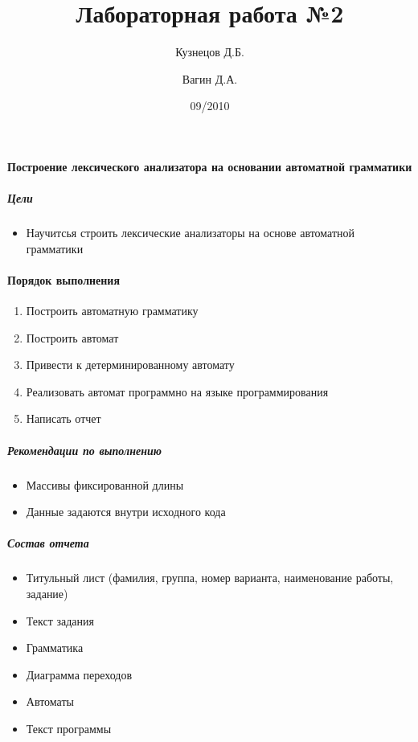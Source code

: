 \documentclass[a4paper,12pt]{article}
\title{Лабораторная работа №2}
\author{Кузнецов Д.Б.\and Вагин Д.А.}
\date{09/2010}
\begin{document}
\paragraph{Построение лексического анализатора на основании автоматной грамматики}
\subparagraph{Цели}
\begin{itemize}
	\item Научитсья строить лексические анализаторы на основе автоматной грамматики
\end{itemize}

\paragraph{Порядок выполнения}
\begin{enumerate}
	\item Построить автоматную грамматику
	\item Построить автомат
	\item Привести к детерминированному автомату
	\item Реализовать автомат программно на языке программирования
	\item Написать отчет
\end{enumerate}

\subparagraph{Рекомендации по выполнению}
\begin{itemize}
	\item Массивы фиксированной длины
	\item Данные задаются внутри исходного кода
\end{itemize}

\subparagraph{Состав отчета}
\begin{itemize}
	\item Титульный лист (фамилия, группа, номер варианта, наименование работы, задание)
	\item Текст задания
	\item Грамматика
	\item Диаграмма переходов
	\item Автоматы
	\item Текст программы
\end{itemize}
\end{document}

